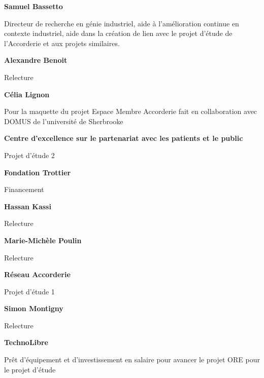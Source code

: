 %

%

\textbf{Samuel Bassetto}

Directeur de recherche en génie industriel, aide à l’amélioration continue en contexte industriel, aide dans la création de lien avec le projet d’étude de l’Accorderie et aux projets similaires.

\textbf{Alexandre Benoit}

Relecture

\textbf{Célia Lignon}

Pour la maquette du projet Espace Membre Accorderie fait en collaboration avec DOMUS de l’université de Sherbrooke

\textbf{Centre d'excellence sur le partenariat avec les patients et le public}

Projet d’étude 2

\textbf{Fondation Trottier}

Financement

\textbf{Hassan Kassi}

Relecture

\textbf{Marie-Michèle Poulin}

Relecture

\textbf{Réseau Accorderie}

Projet d’étude 1

\textbf{Simon Montigny}

Relecture

\textbf{TechnoLibre}

Prêt d’équipement et d'investissement en salaire pour avancer le projet ORE pour le projet d’étude
